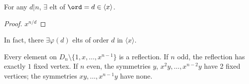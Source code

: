 \documentclass[12pt,oneside]{article}
\begin{document}
\begin{corollary}
  For any $d | n$, $\exists$ elt of $\ord = d \in \langle  x\rangle$.
\end{corollary}
\begin{proof}
  $x^{n/d}$
\end{proof}
\begin{remark}
  In fact, there $\exists \varphi(d)$ elts of order $d$ in $\langle x\rangle$.
\end{remark}

\begin{proposition}
  Every element on $D_n \setminus \{1, x, \dots, x^{n-1}\}$ is a reflection. If $n$ odd, the reflection has exactly $1$ fixed vertex. If $n$ even, the symmetries $y$, $x^2 y, \dots, x^{n-2}y$ have 2 fixed vertices; the symmetries $xy, \dots, x^{n-1}y$ have none.
\end{proposition}
\end{document}
